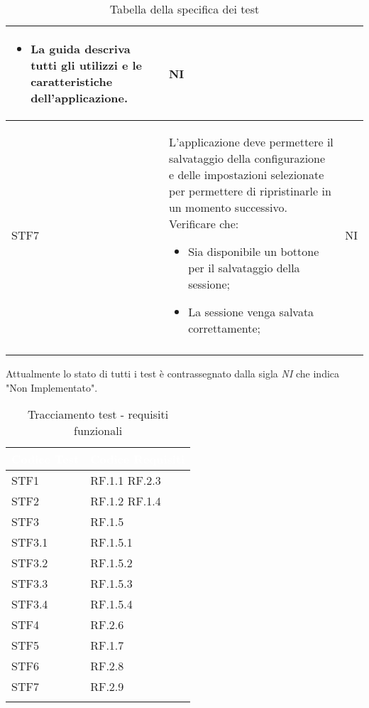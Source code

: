 \begin{center}
\begin{longtable}{|p{1.5cm}|p{11cm}|p{1cm}|}
\begin{itemize}
            \item La guida descriva tutti gli utilizzi e le caratteristiche dell'applicazione.
        \end{itemize} & NI\\ \hline
        \rowcolor[HTML]{EFEFEF}
        STF7 & L'applicazione deve permettere il salvataggio della configurazione e delle impostazioni selezionate per permettere di ripristinarle in un momento successivo. Verificare che: \begin{itemize}
            \item Sia disponibile un bottone per il salvataggio della sessione;
            \item La sessione venga salvata correttamente;
        \end{itemize}& NI\\ \hline
        \caption{Tabella della specifica dei test}
    \end{longtable}
\end{center}

    Attualmente lo stato di tutti i test è contrassegnato dalla sigla \textit{NI} che indica "Non Implementato".
\begin{center}
    \renewcommand\arraystretch{1.5}
    \centering
    \begin{longtable}{|p{3cm}|p{10cm}|} \hline
        \rowcolor[HTML]{036400}
        \textcolor{white}{\textbf{Codice Test}} & \textcolor{white}{\textbf{Codice Requisiti}} \\ \hline
        \rowcolor[HTML]{EFEFEF}
        STF1 & RF.1.1 RF.2.3\\ \hline
        \rowcolor[HTML]{C0C0C0}
        STF2 & RF.1.2 RF.1.4 \\ \hline
        \rowcolor[HTML]{EFEFEF}
        STF3 & RF.1.5 \\ \hline
        \rowcolor[HTML]{C0C0C0}
        STF3.1 & RF.1.5.1 \\ \hline
        \rowcolor[HTML]{EFEFEF}
        STF3.2 & RF.1.5.2 \\ \hline
        \rowcolor[HTML]{C0C0C0}
        STF3.3 & RF.1.5.3 \\ \hline
        \rowcolor[HTML]{EFEFEF}
        STF3.4 & RF.1.5.4 \\ \hline
        \rowcolor[HTML]{C0C0C0}
        STF4 & RF.2.6 \\ \hline
        \rowcolor[HTML]{EFEFEF}
        STF5 & RF.1.7 \\ \hline
        \rowcolor[HTML]{C0C0C0}
        STF6 & RF.2.8 \\ \hline
        \rowcolor[HTML]{EFEFEF}
        STF7 & RF.2.9 \\ \hline
        \caption{Tracciamento test - requisiti funzionali}
    \end{longtable}
\end{center}
